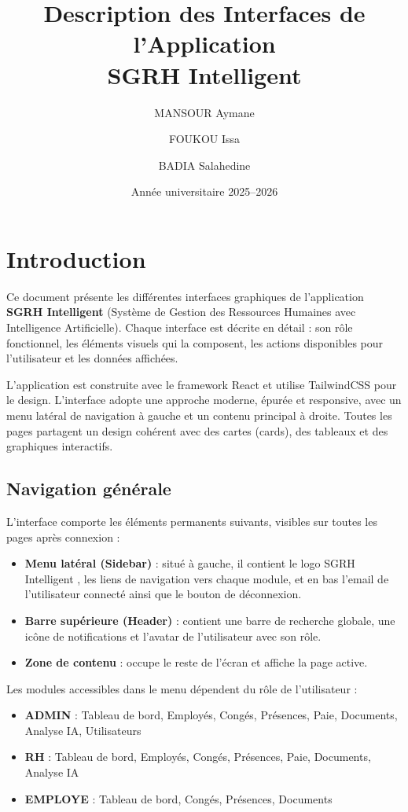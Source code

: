 \documentclass[12pt,a4paper]{report}
\title{Description des Interfaces de l'Application\\SGRH Intelligent}
\author{MANSOUR Aymane \and FOUKOU Issa \and BADIA Salahedine}
\date{Année universitaire 2025--2026}
\begin{document}
\sloppy

\maketitle
\tableofcontents
\newpage

\chapter{Introduction}

Ce document présente les différentes interfaces graphiques de l'application \textbf{SGRH Intelligent} (Système de Gestion des Ressources Humaines avec Intelligence Artificielle). Chaque interface est décrite en détail : son rôle fonctionnel, les éléments visuels qui la composent, les actions disponibles pour l'utilisateur et les données affichées.

L'application est construite avec le framework React et utilise TailwindCSS pour le design. L'interface adopte une approche moderne, épurée et responsive, avec un menu latéral de navigation à gauche et un contenu principal à droite. Toutes les pages partagent un design cohérent avec des cartes (cards), des tableaux et des graphiques interactifs.

\section{Navigation générale}

L'interface comporte les éléments permanents suivants, visibles sur toutes les pages après connexion :

\begin{itemize}
    \item \textbf{Menu latéral (Sidebar)} : situé à gauche, il contient le logo \og SGRH Intelligent \fg{}, les liens de navigation vers chaque module, et en bas l'email de l'utilisateur connecté ainsi que le bouton de déconnexion.
    \item \textbf{Barre supérieure (Header)} : contient une barre de recherche globale, une icône de notifications et l'avatar de l'utilisateur avec son rôle.
    \item \textbf{Zone de contenu} : occupe le reste de l'écran et affiche la page active.
\end{itemize}

Les modules accessibles dans le menu dépendent du rôle de l'utilisateur :
\begin{itemize}
    \item \textbf{ADMIN} : Tableau de bord, Employés, Congés, Présences, Paie, Documents, Analyse IA, Utilisateurs
    \item \textbf{RH} : Tableau de bord, Employés, Congés, Présences, Paie, Documents, Analyse IA
    \item \textbf{EMPLOYE} : Tableau de bord, Congés, Présences, Documents
\end{itemize}
\end{document}

